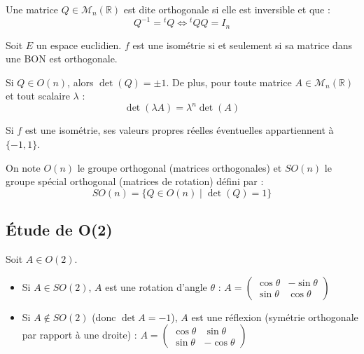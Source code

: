 \documentclass[french]{yLectureNote}
\begin{document}
\begin{definition}
    Une matrice $Q \in \mathcal{M}_n(\mathbb{R})$ est dite orthogonale si elle est inversible et que :
    $$Q^{-1} = {}^tQ \iff {}^tQQ = I_n$$
\end{definition}

\begin{proposition}
    Soit $E$ un espace euclidien. $f$ est une isométrie si et seulement si sa matrice dans une BON est orthogonale.
\end{proposition}


\begin{proposition}
    Si $Q \in O(n)$, alors $\det(Q) = \pm 1$. 
    De plus, pour toute matrice $A \in \mathcal{M}_n(\mathbb{R})$ et tout scalaire $\lambda$ :
    $$\det(\lambda A) = \lambda^n \det(A)$$
\end{proposition}

\begin{proposition}
    Si $f$ est une isométrie, ses valeurs propres réelles éventuelles appartiennent à $\{-1, 1\}$.
\end{proposition}

\begin{definition}
    On note $O(n)$ le groupe orthogonal (matrices orthogonales) et $SO(n)$ le groupe spécial orthogonal (matrices de rotation) défini par :
    $$SO(n) = \{ Q \in O(n) \mid \det(Q) = 1 \}$$
\end{definition}

\subsection{Étude de O(2)}

\begin{proposition}
    Soit $A \in O(2)$.
    \begin{itemize}
        \item Si $A \in SO(2)$, $A$ est une rotation d'angle $\theta$ : 
        $A = \begin{pmatrix} \cos \theta & -\sin \theta \\ \sin \theta & \cos \theta \end{pmatrix}$
        \item Si $A \notin SO(2)$ (donc $\det A = -1$), $A$ est une réflexion (symétrie orthogonale par rapport à une droite) :
        $A = \begin{pmatrix} \cos \theta & \sin \theta \\ \sin \theta & -\cos \theta \end{pmatrix}$
    \end{itemize}
\end{proposition}
\end{document}
